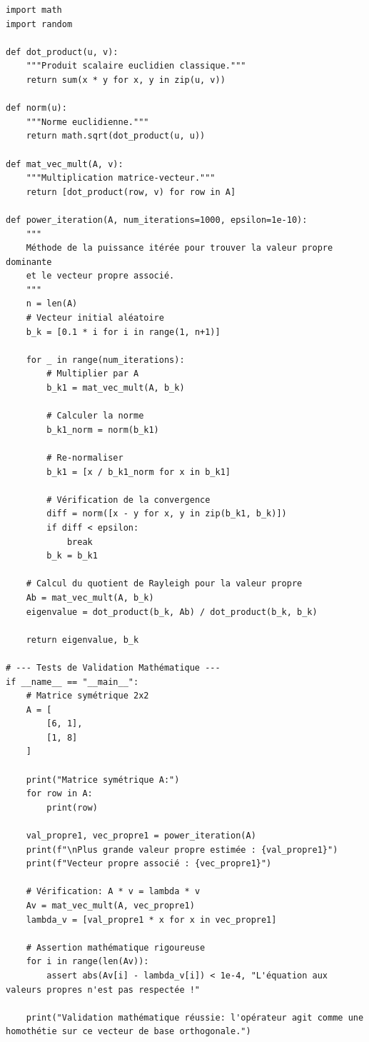 \documentclass[11pt,a4paper]{article}
\begin{document}
\begin{lstlisting}
import math
import random

def dot_product(u, v):
    """Produit scalaire euclidien classique."""
    return sum(x * y for x, y in zip(u, v))

def norm(u):
    """Norme euclidienne."""
    return math.sqrt(dot_product(u, u))

def mat_vec_mult(A, v):
    """Multiplication matrice-vecteur."""
    return [dot_product(row, v) for row in A]

def power_iteration(A, num_iterations=1000, epsilon=1e-10):
    """
    Méthode de la puissance itérée pour trouver la valeur propre dominante
    et le vecteur propre associé.
    """
    n = len(A)
    # Vecteur initial aléatoire
    b_k = [0.1 * i for i in range(1, n+1)]

    for _ in range(num_iterations):
        # Multiplier par A
        b_k1 = mat_vec_mult(A, b_k)

        # Calculer la norme
        b_k1_norm = norm(b_k1)

        # Re-normaliser
        b_k1 = [x / b_k1_norm for x in b_k1]

        # Vérification de la convergence
        diff = norm([x - y for x, y in zip(b_k1, b_k)])
        if diff < epsilon:
            break
        b_k = b_k1

    # Calcul du quotient de Rayleigh pour la valeur propre
    Ab = mat_vec_mult(A, b_k)
    eigenvalue = dot_product(b_k, Ab) / dot_product(b_k, b_k)

    return eigenvalue, b_k

# --- Tests de Validation Mathématique ---
if __name__ == "__main__":
    # Matrice symétrique 2x2
    A = [
        [6, 1],
        [1, 8]
    ]

    print("Matrice symétrique A:")
    for row in A:
        print(row)

    val_propre1, vec_propre1 = power_iteration(A)
    print(f"\nPlus grande valeur propre estimée : {val_propre1}")
    print(f"Vecteur propre associé : {vec_propre1}")

    # Vérification: A * v = lambda * v
    Av = mat_vec_mult(A, vec_propre1)
    lambda_v = [val_propre1 * x for x in vec_propre1]

    # Assertion mathématique rigoureuse
    for i in range(len(Av)):
        assert abs(Av[i] - lambda_v[i]) < 1e-4, "L'équation aux valeurs propres n'est pas respectée !"

    print("Validation mathématique réussie: l'opérateur agit comme une homothétie sur ce vecteur de base orthogonale.")
\end{lstlisting}
\end{document}
